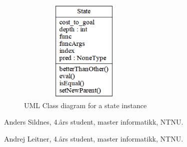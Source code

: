 \documentclass[journal]{IEEEtran}
\begin{document}
\begin{figure}[Hb]
\centering
\includegraphics[height=5cm,keepaspectratio,width=2.5in]{fig/state.png}%
\caption{UML Class diagram for a state instance}
\label{fig:UMLstate}
\end{figure}


%

\begin{IEEEbiographynophoto}{Anders Sildnes,}
    4.års student, master informatikk, NTNU.\
\end{IEEEbiographynophoto}
\begin{IEEEbiographynophoto}{Andrej Leitner,}
    4.års student, master informatikk, NTNU.\
\end{IEEEbiographynophoto}
\end{document}
